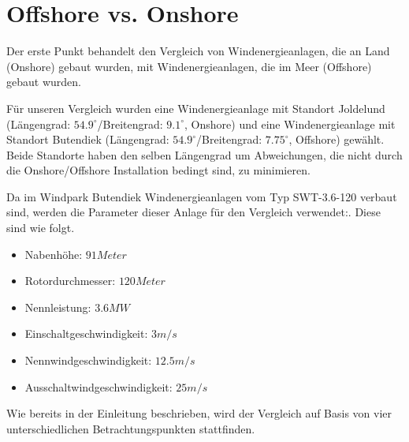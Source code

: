 \documentclass[a4paper,12pt]{article}
\begin{document}
	\section{Offshore vs. Onshore}
	Der erste Punkt behandelt den Vergleich von Windenergieanlagen, die an Land (Onshore) gebaut wurden, mit Windenergieanlagen, die im Meer (Offshore) gebaut wurden.\\ \par
	\noindent Für unseren Vergleich wurden eine Windenergieanlage mit Standort Joldelund (Längengrad: $54.9^{\circ}$/Breitengrad: $9.1^{\circ}$, Onshore) und eine Windenergieanlage mit Standort Butendiek (Längengrad: $54.9^{\circ}$/Breitengrad: $7.75^{\circ}$, Offshore) gewählt. Beide Standorte haben den selben Längengrad um Abweichungen, die nicht durch die Onshore/Offshore Installation bedingt sind, zu minimieren.\\ \par \noindent Da im Windpark Butendiek Windenergieanlagen vom Typ SWT-3.6-120 verbaut sind, werden die Parameter dieser Anlage für den Vergleich verwendet:.\newline
	Diese sind wie folgt.
	\begin{itemize}
		\item Nabenhöhe: $91 Meter$
		\item Rotordurchmesser: $120 Meter$
		\item Nennleistung: $3.6MW$
		\item Einschaltgeschwindigkeit: $3m/s$
		\item Nennwindgeschwindigkeit: $12.5m/s$
		\item Ausschaltwindgeschwindigkeit: $25m/s$
	\end{itemize}
	\noindent Wie bereits in der Einleitung beschrieben, wird der Vergleich auf Basis von vier unterschiedlichen Betrachtungspunkten stattfinden.
\end{document}
